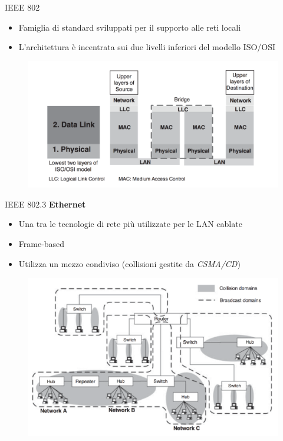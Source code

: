 \begin{frame}{IEEE 802}
	\begin{itemize}
		\item Famiglia di standard sviluppati per il supporto alle reti locali
		\item L'architettura è incentrata sui due livelli inferiori del modello ISO/OSI
	\end{itemize}
	\begin{figure}[h] 
		\includegraphics[scale=0.3,cfbox=blue_slides 1pt 0pt]{imgs/arch_ieee802.png}
	\end{figure}
\end{frame}

\begin{frame}{IEEE 802.3}
	\textbf{Ethernet}
	\begin{itemize}
		\item Una tra le tecnologie di rete più utilizzate per le LAN cablate
		\item Frame-based
		\item Utilizza un mezzo condiviso (collisioni gestite da \textit{CSMA/CD})
	\end{itemize}
	\begin{figure}[h] 
		\includegraphics[scale=0.23,cfbox=blue_slides 1pt 0pt]{imgs/lan.png}
	\end{figure}
\end{frame}


